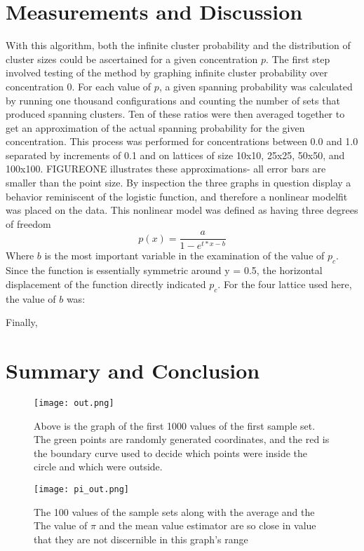 \documentclass[twocolumn,prb,amsmath,amssymb,amsfonts]{revtex4}
\begin{document}
\section{Measurements and Discussion}
With this algorithm, both the infinite cluster probability and the distribution of cluster sizes could be ascertained for a given concentration $p$. The first step involved testing of the method by graphing infinite cluster probability over concentration 0. For each value of $p$, a given spanning probability was calculated by running one thousand configurations and counting the number of sets that produced spanning clusters. Ten of these ratios were then averaged together to get an approximation of the actual spanning probability for the given concentration.
This process was performed for concentrations between 0.0 and 1.0 separated by increments of 0.1 and on lattices of size 10x10, 25x25, 50x50, and 100x100. 
FIGUREONE illustrates these approximations- all error bars are smaller than the point size.  
By inspection the three graphs in question display a behavior reminiscent of the logistic function, and therefore a nonlinear modelfit was placed on the data. This nonlinear model was defined as having three degrees of freedom
\begin{equation}
  p(x) = \frac{a}{1-e^{t*x-b}}
\end{equation}
Where $b$ is the most important variable in the examination of the value of $p_c$. Since the function is essentially symmetric around y = 0.5, the horizontal displacement of the function directly indicated $p_c$. For the four lattice used here, the value of $b$ was:

Finally, 
\section{Summary and Conclusion}


\begin{figure*}
\texttt{[image: out.png]}
\caption{Above is the graph of the first 1000 values of the first sample set. The green points are randomly generated coordinates, and the red is the boundary curve used to decide which points were inside the circle and which were outside.}
\end{figure*}

\begin{figure*}
\texttt{[image: pi\_out.png]}
\caption{The 100 values of the sample sets along with the average and the The value of $\pi$ and the mean value estimator are so close in value that they are not discernible in this graph's range}
\end{figure*}
\end{document}
